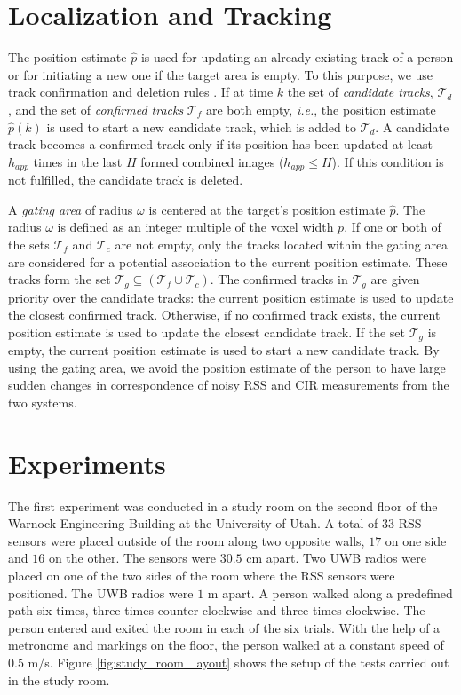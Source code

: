 \documentclass[conference]{IEEEtran}
\begin{document}
\section{Localization and Tracking} \label{sec:gating}

The position estimate $\hat{p}$ is used for updating an already
existing track of a person or for initiating a new one if the target
area is empty. To this purpose, we use track confirmation and deletion
rules \cite{blackman99}. If at time $k$ the set of \emph{candidate
  tracks}, $\mathcal{T}_d$, and the set of \emph{confirmed tracks}
$\mathcal{T}_f$ are both empty, \emph{i.e.}, the position estimate
$\hat{p}(k)$ is used to start a new candidate track, which is added to
$\mathcal{T}_d$. A candidate track becomes a confirmed track only if
its position has been updated at least $h_{app}$ times in the last $H$
formed combined images ($h_{app} \le H$). If this condition is not
fulfilled, the candidate track is deleted.

A \emph{gating area} of radius $\omega$ is centered at the target's
position estimate $\hat{p}$. The radius $\omega$ is defined as an
integer multiple of the voxel width $p$. If one or both of the sets
$\mathcal{T}_f$ and $\mathcal{T}_c$ are not empty, only the tracks
located within the gating area are considered for a potential
association to the current position estimate. These tracks form the
set $\mathcal{T}_g \subseteq (\mathcal{T}_f \cup \mathcal{T}_c)$. The
confirmed tracks in $\mathcal{T}_g$ are given priority over the
candidate tracks: the current position estimate is used to update the
closest confirmed track. Otherwise, if no confirmed track exists, the
current position estimate is used to update the closest candidate
track. If the set $\mathcal{T}_g$ is empty, the current position
estimate is used to start a new candidate track. By using the gating
area, we avoid the position estimate of the person to have large
sudden changes in correspondence of noisy RSS and CIR measurements
from the two systems.





\section{Experiments} \label{sec:experiments}

The first experiment was conducted in a study room on the second floor
of the Warnock Engineering Building at the University of Utah. A total
of $33$ RSS sensors were placed outside of the room along two opposite
walls, $17$ on one side and $16$ on the other. The sensors were $30.5$
cm apart. Two UWB radios were placed on one of the two sides of the
room where the RSS sensors were positioned. The UWB radios were $1$ m
apart. A person walked along a predefined path six times, three times
counter-clockwise and three times clockwise. The person entered and
exited the room in each of the six trials. With the help of a
metronome and markings on the floor, the person walked at a constant
speed of $0.5$ m/s. Figure \ref{fig:study_room_layout} shows the setup
of the tests carried out in the study room.
\end{document}
